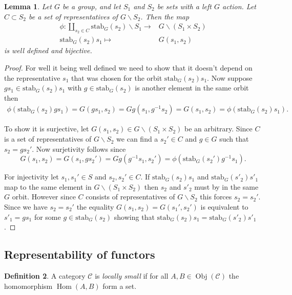 \documentclass[a4paper,12pt,reqno]{amsart}
\newcommand{\stab}[2]{\text{stab}_{#1}(#2)}
\DeclareMathOperator{\Hom}{Hom}
\DeclareMathOperator{\Obj}{Obj}
\newtheorem{lemma}{Lemma}
\theoremstyle{definition}
\newtheorem{definition}[lemma]{Definition}
\numberwithin{lemma}{section}
\numberwithin{equation}{section}
\numberwithin{figure}{section}
\begin{document}
\begin{lemma}
	Let $G$ be a group, and let $S_1$ and $S_2$ be sets with a left $G$ action. Let $C \subset S_2$ be a set of representatives of $G\backslash S_2$.
	Then the map \begin{align*}
	\phi : \coprod_{s_2 \in C} \stab{G}{s_2}\backslash S_1 \to& G \backslash(S_1 \times S_2)\\
	 \stab{G}{s_2}s_1\mapsto& G(s_1,s_2)
	\end{align*}
	is well defined and bijective.
\end{lemma}
\begin{proof}
For well it being well defined we need to show that it doesn't depend on the representative $s_1$ that was chosen for the orbit $\stab{G}{s_2}s_1$. Now suppose $gs_1 \in \stab{G}{s_2}s_1$ with $g \in \stab{G}{s_2}$ is another element in the same orbit then \begin{align*}\phi(\stab{G}{s_2}gs_1) = G(gs_1,s_2)=Gg(s_1,g^{-1}s_2)=G(s_1,s_2)=\phi(\stab{G}{s_2}s_1). \end{align*}

To show it is surjective, let $G(s_1,s_2) \in G\backslash(S_1 \times S_2)$ be an arbitrary. Since $C$ is a set of representatives of $G\backslash S_2$ we can find a $s_2' \in C$ and $g \in G$ such that $s_2=gs_2'$. Now surjetivity follows since $$G(s_1,s_2)=G(s_1,gs_2')=Gg(g^{-1}s_1,s_2') =  \phi(\stab{G}{s_2'}g^{-1}s_1).$$

For injectivity let $s_1, s_1' \in S$ and $s_2, s_2' \in C$. If  $\stab{G}{s_2}s_1$ and $\stab{G}{s'_2}s'_1$ map to the same element in $G\backslash(S_1 \times S_2)$ then $s_2$ and $s'_2$ must by in the same $G$ orbit. However since $C$ consists of representatives of $G \backslash S_2$ this forces $s_2 = s_2'$. Since we have $s_2=s_2'$ the equality $G(s_1,s_2) = G(s_1',s_2')$ is equivalent to $s'_1=gs_1$ for some $g \in \stab{G}{s_2}$ showing that $\stab{G}{s_2}s_1=\stab{G}{s'_2}s'_1$.
\end{proof}

\subsection{Representability of functors}


\begin{definition}
A category $\mathcal C$ is \textit{locally small} if for all $A,B \in \Obj(\mathcal C)$ the homomorphism $\Hom(A,B)$ form a set.
\end{definition}
\end{document}
